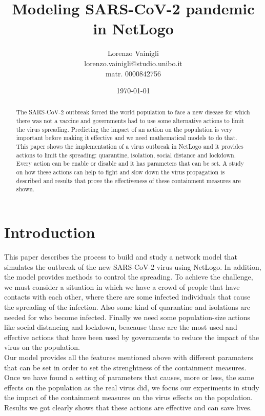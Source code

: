 \documentclass[12pt]{llncs}
\title{Modeling SARS-CoV-2 pandemic in NetLogo}
\author{Lorenzo Vainigli \\
lorenzo.vainigli@studio.unibo.it \\
matr. 0000842756}
\institute{Course of Complex Systems and Network Science \\
Laurea Magistrale in Informatica \\
University of Bologna \\
A.Y. 2020-2021}
\date{\today}
\begin{document}
{\def\addcontentsline#1#2#3{}\maketitle}

\begin{abstract}
The SARS-CoV-2 outbreak forced the world population to face a new disease for which there was not a vaccine and governments had to use some alternative actions to limit the virus spreading. Predicting the impact of an action on the population is very important before making it effective and we need mathematical models to do that. This paper shows the implementation of a virus outbreak in NetLogo and it provides actions to limit the spreading: quarantine, isolation, social distance and lockdown. Every action can be enable or disable and it has parameters that can be set. A study on how these actions can help to fight and slow down the virus propagation is described and results that prove the effectiveness of these containment measures are shown.
\end{abstract}

\begingroup
\let\clearpage\relax
\renewcommand{\contentsname}{}
\setcounter{tocdepth}{2}
\tableofcontents
\endgroup

\section{Introduction}
This paper describes the process to build and study a network model that simulates the outbreak of the new SARS-CoV-2 virus using NetLogo. In addition, the model provides methods to control the spreading. To achieve the challenge, we must consider a situation in which we have a crowd of people that have contacts with each other, where there are some infected individuals that cause the spreading of the infection. Also some kind of quarantine and isolations are needed for who become infected. Finally we need some population-size actions like social distancing and lockdown, beacause these are the most used and effective actions that have been used by governments to reduce the impact of the virus on the population.\\
Our model provides all the features mentioned above with different paramaters that can be set in order to set the strenghtness of the containment measures.\\
Once we have found a setting of parameters that causes, more or less, the same effects on the population as the real virus did, we focus our experiments in study the impact of the containment measures on the virus effects on the population. Results we got clearly shows that these actions are effective and can save lives.
\end{document}
